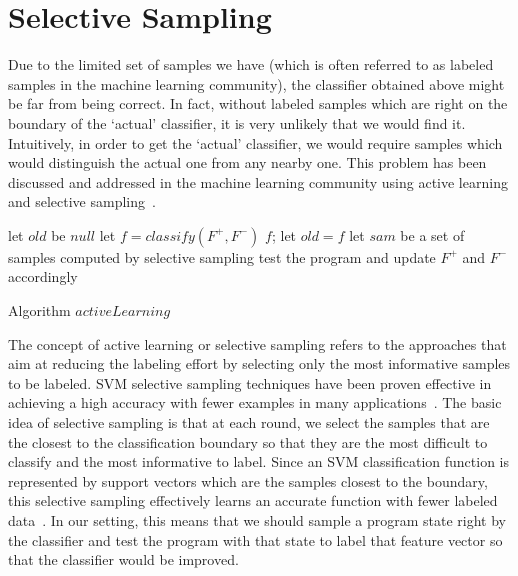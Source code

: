 
\section{Selective Sampling}
Due to the limited set of samples we have (which is often referred to as labeled samples in the machine learning community), 
the classifier obtained above might be far from being correct. 
In fact, without labeled samples which are right on the boundary of the `actual' classifier, 
it is very unlikely that we would find it. 
Intuitively, in order to get the `actual' classifier, we would require samples which would distinguish the actual one from any nearby one. 
This problem has been discussed and addressed in the machine learning community using active learning and selective sampling~\cite{DBLP:conf/icml/SchohnC00}.

\begin{algorithm}[t]
\SetAlgoVlined
\Indm
{}
\Indp
let $old$ be $null$\;
 {
    let $f = classify(F^+, F^-)$\;
     {
        \Return $f$;
    }
    let $old = f$\;
    let $sam$ be a set of samples computed by selective sampling\;
    test the program and update $F^+$ and $F^-$ accordingly\;
}
\caption{Algorithm $activeLearning$}
\label{alg:active}
\end{algorithm}

The concept of active learning or selective sampling refers to the approaches 
that aim at reducing the labeling effort by selecting only the most informative samples to be labeled. 
SVM selective sampling techniques have been proven effective in achieving a high accuracy 
with fewer examples in many applications~\cite{DBLP:conf/mm/TongC01,DBLP:journals/jmlr/TongK01}. 
The basic idea of selective sampling is that at each round, 
we select the samples that are the closest to the classification boundary so that they are the most difficult to classify and the most informative to label. 
Since an SVM classification function is represented by support vectors which are the samples closest to the boundary, 
this selective sampling effectively learns an accurate function with fewer labeled data~\cite{DBLP:conf/icml/SchohnC00}. 
In our setting, this means that we should sample a program state right by the classifier and test the program 
with that state to label that feature vector so that the classifier would be improved.

